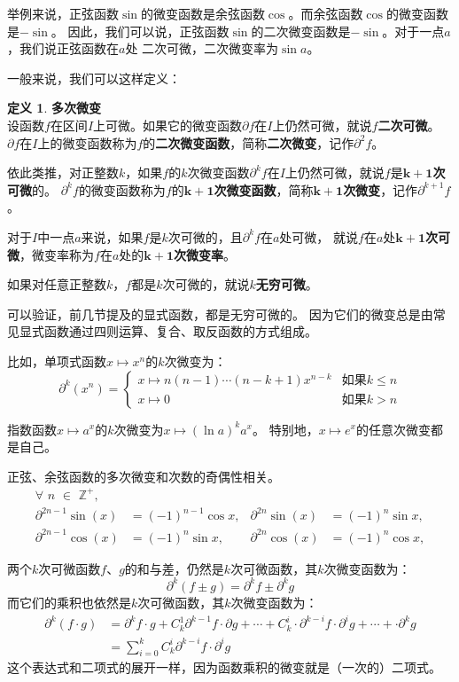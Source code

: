 \documentclass[12pt,UTF8]{ctexbook}
\theoremstyle{definition}
\newtheorem{df}{定义}[section]
\theoremstyle{plain}
\begin{document}
举例来说，正弦函数$\sin$的微变函数是余弦函数$\cos$。而余弦函数$\cos$的微变函数是$-\sin$。
因此，我们可以说，正弦函数$\sin$的二次微变函数是$-\sin$。对于一点$a$，我们说正弦函数在$a$处
二次可微，二次微变率为$\sin{a}$。

一般来说，我们可以这样定义：
\begin{df}{\textbf{多次微变}}
    \mbox{} \\
    设函数$f$在区间$I$上可微。如果它的微变函数$\partial f$在$I$上仍然可微，就说$f$\textbf{二次可微}。
    $\partial f$在$I$上的微变函数称为$f$的\textbf{二次微变函数}，简称\textbf{二次微变}，记作$\partial^2 f$。
    
    依此类推，对正整数$k$，如果$f$的$k$次微变函数$\partial^k f$在$I$上仍然可微，就说$f$是$\boldsymbol{k+1}$\textbf{次可微}的。
    $\partial^k f$的微变函数称为$f$的$\boldsymbol{k+1}$\textbf{次微变函数}，简称$\boldsymbol{k+1}$\textbf{次微变}，记作$\partial^{k+1} f$。

    对于$I$中一点$a$来说，如果$f$是$k$次可微的，且$\partial^k f$在$a$处可微，
    就说$f$在$a$处$\boldsymbol{k+1}$\textbf{次可微}，微变率称为$f$在$a$处的$\boldsymbol{k+1}$\textbf{次微变率}。

    如果对任意正整数$k$，$f$都是$k$次可微的，就说$k$\textbf{无穷可微}。
\end{df}

可以验证，前几节提及的显式函数，都是无穷可微的。
因为它们的微变总是由常见显式函数通过四则运算、复合、取反函数的方式组成。

比如，单项式函数$x\mapsto x^n$的$k$次微变为：
$$ \partial^k (x^n) = \left\{
    \begin{array}{ll}
        x\mapsto n(n-1)\cdots(n-k+1) x^{n-k} & \mbox{如果} k \leqslant n \\
        x\mapsto 0 & \mbox{如果} k > n
    \end{array}\right.
$$

指数函数$x\mapsto a^x$的$k$次微变为$x\mapsto (\ln{a})^k a^x$。
特别地，$x\mapsto e^x$的任意次微变都是自己。

正弦、余弦函数的多次微变和次数的奇偶性相关。
\begin{align*}
    \forall \,\,n\,\,\in\,\,\mathbb{Z}^+, \\
    \partial^{2n-1} \sin(x) &= (-1)^{n-1} \cos{x}, & \partial^{2n} \sin(x) &= (-1)^{n} \sin{x},  \\
    \partial^{2n-1} \cos(x) &= (-1)^{n} \sin{x}, & \partial^{2n} \cos(x) &= (-1)^{n} \cos{x},  
\end{align*}

两个$k$次可微函数$f$、$g$的和与差，仍然是$k$次可微函数，其$k$次微变函数为：
$$ \partial^k (f \pm g) = \partial^k f \pm \partial^k g $$
而它们的乘积也依然是$k$次可微函数，其$k$次微变函数为：
\begin{align*}
    \partial^k (f \cdot g) &= \partial^k f \cdot g + C_k^1 \partial^{k-1} f \cdot \partial g + \cdots + C_k^i \cdot \partial^{k-i} f \cdot  \partial^i g + \cdots + \cdot \partial^{k} g  \\
    &= \sum_{i=0}^k C_k^i \partial^{k-i} f \cdot  \partial^i g 
\end{align*}
这个表达式和二项式的展开一样，因为函数乘积的微变就是（一次的）二项式。
\end{document}
